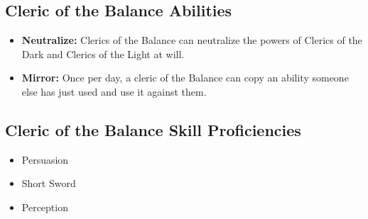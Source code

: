 \begin{multicols}{2}
\subsection{Cleric of the Balance Abilities}

\begin{itemize}
  \item \textbf{Neutralize:} Clerics of the Balance can neutralize the powers of
    Clerics of the Dark and Clerics of the Light at will.
  \item \textbf{Mirror:} Once per day, a cleric of the Balance can copy an ability
    someone else has just used and use it against them.
\end{itemize}

\subsection{Cleric of the Balance Skill Proficiencies}

\begin{itemize}
  \item Persuasion
  \item Short Sword
  \item Perception
\end{itemize}

\end{multicols}

